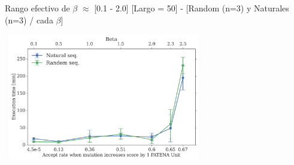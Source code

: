 \documentclass{beamer}
\begin{document}
% 
%


\begin{frame}[plain]{Rango efectivo de $\beta$ $\approx$ [0.1 - 2.0]}
\centering
[Largo = 50] - [Random (n=3) y Naturales (n=3) / cada $\beta$] \\
\begin{adjustwidth}{-1.5em}{-2.5em}
\includegraphics[width=330px,height=210px]{../img/beta-vs-time-length50-300dpi.png} 
\end{adjustwidth}
\end{frame}
\end{document}
